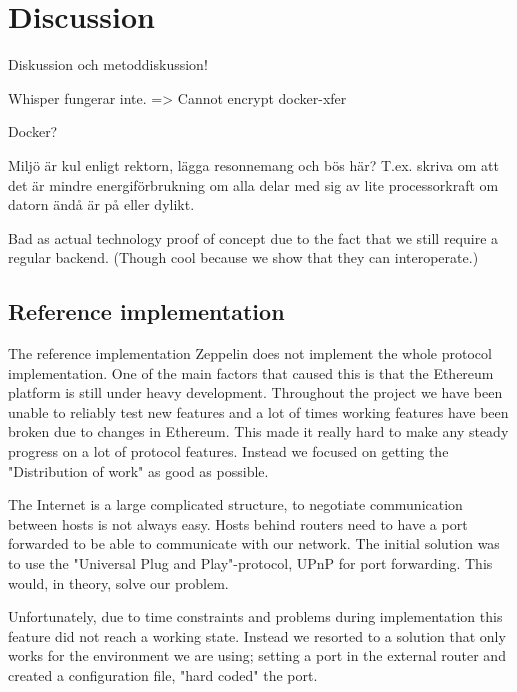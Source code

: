 \chapter{Discussion}
Diskussion och metoddiskussion!

Whisper fungerar inte. => Cannot encrypt docker-xfer

Docker?

Miljö är kul enligt rektorn, lägga resonnemang och bös här? T.ex. skriva om att det är mindre energiförbrukning om alla delar med sig av lite processorkraft om datorn ändå är på eller dylikt. 

Bad as actual technology proof of concept due to the fact that we still require a regular backend. (Though cool because we show that they can interoperate.)

\section{Reference implementation}
The reference implementation Zeppelin does not implement the whole protocol implementation. One of the main factors that caused this is that the Ethereum platform is still under heavy development. Throughout the project we have been unable to reliably test new features and a lot of times working features have been broken due to changes in Ethereum. This made it really hard to make any steady progress on a lot of protocol features. Instead we focused on getting the "Distribution of work" as good as possible.

The Internet is a large complicated structure, to negotiate communication between hosts is not always easy. Hosts behind routers need to have a port forwarded to be able to communicate with our network. The initial solution was to use the "Universal Plug and Play"-protocol, UPnP for port forwarding. This would, in theory, solve our problem.

Unfortunately, due to time constraints and problems during implementation this feature did not reach a working state. Instead we resorted to a solution that only works for the environment we are using; setting a port in the external router and created a configuration file, "hard coded" the port. 